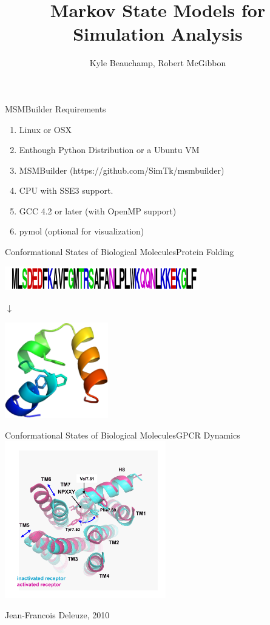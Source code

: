 \documentclass[10pt]{beamer}
\title{Markov State Models for Simulation Analysis}
\author{Kyle Beauchamp, Robert McGibbon}
\begin{document}
\begin{frame}{MSMBuilder Requirements}
 
\begin{enumerate}
 \item Linux or OSX
 \item Enthough Python Distribution or a Ubuntu VM
 \item MSMBuilder (https://github.com/SimTk/msmbuilder)
 \item CPU with SSE3 support.
 \item GCC 4.2 or later (with OpenMP support)
 \item pymol (optional for visualization)

\end{enumerate} 
 
\end{frame}


\begin{frame}
 \maketitle
\end{frame}

\begin{frame}{Conformational States of Biological Molecules}{Protein Folding}

 \includegraphics[width=85mm]{Figures/SequenceLogo} 

\large{$\downarrow$}

\includegraphics[width=45mm]{Figures/StructureForLogo}

\end{frame}


\begin{frame}{Conformational States of Biological Molecules}{GPCR Dynamics}
\includegraphics[width=7.0cm]{Figures/GPCR.png}

\tiny
Jean-Francois Deleuze, 2010 

\end{frame}
\end{document}
